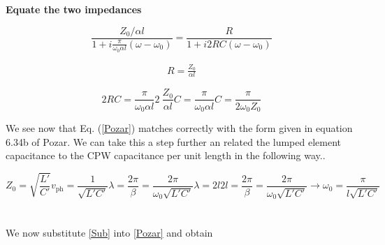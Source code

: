 \documentclass[12pt,reqno]{amsart}
\begin{document}
\textbf{Equate the two impedances}

\begin{equation}
\frac{Z_0/\alpha l}{1 + i \frac{\pi}{\omega_0 \alpha l}(\omega - \omega_0)} = \frac{R}{1 + i2RC(\omega - \omega_0)}
\end{equation}

\begin{eqnarray}
R = \frac{Z_0}{\alpha l}
\end{eqnarray}

\begin{subequations}
	\begin{equation}
	2RC = \frac{\pi}{\omega_0 \alpha l}
	\end{equation}
	\begin{equation}
	2\ \frac{Z_0}{\alpha l} C = \frac{\pi}{\omega_0 \alpha l}
	\end{equation}
	\begin{equation}
	C = \frac{\pi}{2\omega_0 Z_0} \label{Pozar}
	\end{equation}
\end{subequations}

We see now that Eq. (\ref{Pozar}) matches correctly with the form given in equation 6.34b of Pozar. We can take this a step further an related the lumped element capacitance to the CPW capacitance per unit length in the following way..

\begin{subequations}
	\begin{equation}
	Z_0 = \sqrt {\frac{L'}{C'} }
	\end{equation}
	\begin{equation}
	v_\text{ph} = \frac{1}{\sqrt{L'C'}}
	\end{equation}
	\begin{equation}
	\lambda = \frac{2\pi}{\beta} = \frac{2\pi}{\omega_0\sqrt{L'C'}} \label{lambda}
	\end{equation}
	\begin{equation}
	\lambda = 2l
	\end{equation}
	\begin{equation}
	2l = \frac{2\pi}{\beta} = \frac{2\pi}{\omega_0\sqrt{L'C'}} \rightarrow \omega_0 = \frac{\pi}{l\sqrt{L'C'}} \label{Sub}
	\end{equation}
\end{subequations}
\\ \ \\
We now substitute \ref{Sub} into \ref{Pozar} and obtain
\end{document}
